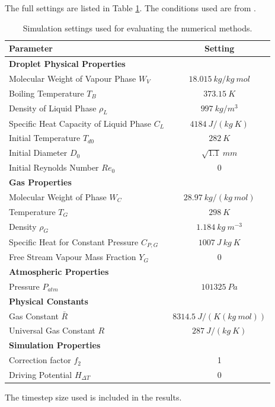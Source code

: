 \documentclass[../Interim_Report_Master]{subfiles}
\begin{document}
The full settings are listed in Table \ref{tab:sim_set_uc}. The conditions used are from \cite{ranz1952}.
\begin{table}[H]
	\centering
	\begin{tabular}{|l c|}
		\hline
		\textbf{Parameter} & \textbf{Setting} \\ \hline
		\textbf{Droplet Physical Properties} &  \\ 
		Molecular Weight of Vapour Phase $W_V$ & $18.015~kg/kg~mol$ \\ 
		Boiling Temperature $T_B$ & $373.15~K$ \\ 
		Density of Liquid Phase $\rho_L$ & $997~kg/m^3$ \\
		Specific Heat Capacity of Liquid Phase $C_L$ & $4184~J/(kg~K)$ \\ 
		Initial Temperature $T_{d0}$ & $282~K$ \\ 
		Initial Diameter $D_0$ & $\sqrt{1.1}~mm$ \\ 
		Initial Reynolds Number $Re_0$ & $0$ \\ \hline
		\textbf{Gas Properties} &  \\ 
		Molecular Weight of Phase $W_C$ & $28.97~kg/(kg~mol)$ \\ 
		Temperature $T_G$ & $298~K$ \\
		Density $\rho_G$ & $1.184~kg~m^{-3}$ \\ 
		Specific Heat for Constant Pressure $C_{P,G}$ & $1007~J~kg~K$ \\
		Free Stream Vapour Mass Fraction $Y_G$ & $0$ \\ \hline
		\textbf{Atmospheric Properties} &  \\ 
		Pressure $P_{atm}$ & $101325~Pa$ \\ \hline
		\textbf{Physical Constants} &  \\ 
		Gas Constant $\bar{R}$ & $8314.5~J/(K(kg~mol))$ \\ 
		Universal Gas Constant $R$ & $287~J/(kg~K)$ \\ \hline
		\textbf{Simulation Properties} &  \\ 
		Correction factor $f_2$ & 1 \\
		Driving Potential $H_{\Delta T}$ & 0 \\ \hline
	\end{tabular}
	\caption{Simulation settings used for evaluating the numerical methods.}
	\label{tab:sim_set_uc}
\end{table}

The timestep size used is included in the results.
\end{document}
